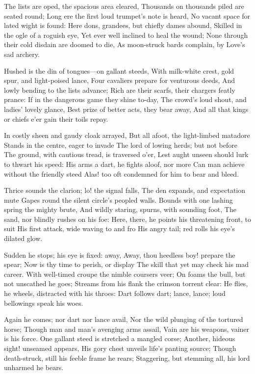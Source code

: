 \documentclass[10pt,twocolumn]{book}
\begin{document}
   The lists are oped, the spacious area cleared,
   Thousands on thousands piled are seated round;
   Long ere the first loud trumpet's note is heard,
   No vacant space for lated wight is found:
   Here dons, grandees, but chiefly dames abound,
   Skilled in the ogle of a roguish eye,
   Yet ever well inclined to heal the wound;
   None through their cold disdain are doomed to die,
As moon-struck bards complain, by Love's sad archery.


   Hushed is the din of tongues---on gallant steeds,
   With milk-white crest, gold spur, and light-poised lance,
   Four cavaliers prepare for venturous deeds,
   And lowly bending to the lists advance;
   Rich are their scarfs, their chargers featly prance:
   If in the dangerous game they shine to-day,
   The crowd's loud shout, and ladies' lovely glance,
   Best prize of better acts, they bear away,
And all that kings or chiefs e'er gain their toils repay.


   In costly sheen and gaudy cloak arrayed,
   But all afoot, the light-limbed matadore
   Stands in the centre, eager to invade
   The lord of lowing herds; but not before
   The ground, with cautious tread, is traversed o'er,
   Lest aught unseen should lurk to thwart his speed:
   His arms a dart, he fights aloof, nor more
   Can man achieve without the friendly steed\textemdash
Alas! too oft condemned for him to bear and bleed.


   Thrice sounds the clarion; lo! the signal falls,
   The den expands, and expectation mute
   Gapes round the silent circle's peopled walls.
   Bounds with one lashing spring the mighty brute,
   And wildly staring, spurns, with sounding foot,
   The sand, nor blindly rushes on his foe:
   Here, there, he points his threatening front, to suit
   His first attack, wide waving to and fro
His angry tail; red rolls his eye's dilated glow.


   Sudden he stops; his eye is fixed:  away,
   Away, thou heedless boy! prepare the spear;
   Now is thy time to perish, or display
   The skill that yet may check his mad career.
   With well-timed croupe the nimble coursers veer;
   On foams the bull, but not unscathed he goes;
   Streams from his flank the crimson torrent clear:
   He flies, he wheels, distracted with his throes:
Dart follows dart; lance, lance; loud bellowings speak his woes.


   Again he comes; nor dart nor lance avail,
   Nor the wild plunging of the tortured horse;
   Though man and man's avenging arms assail,
   Vain are his weapons, vainer is his force.
   One gallant steed is stretched a mangled corse;
   Another, hideous sight! unseamed appears,
   His gory chest unveils life's panting source;
   Though death-struck, still his feeble frame he rears;
Staggering, but stemming all, his lord unharmed he bears.
\end{document}
